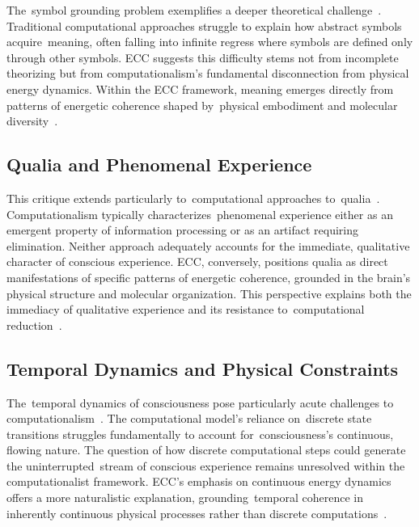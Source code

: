 The~symbol grounding problem exemplifies a deeper theoretical challenge~\cite{harnad1990symbol,juarrero2023context}. Traditional computational approaches struggle to explain how abstract symbols acquire~meaning, often falling into infinite regress where symbols are defined only through other symbols. ECC suggests this difficulty stems not from incomplete theorizing but from computationalism's fundamental disconnection from physical energy dynamics. Within the ECC framework, meaning emerges directly from patterns of energetic coherence shaped by~physical embodiment and molecular diversity~\cite{levin2019computational,gershman2023molecular}.

\subsection*{Qualia and Phenomenal Experience}

This critique extends particularly to~computational approaches to~qualia~\cite{chalmers1997conscious,seth2021being}. Computationalism typically characterizes~phenomenal experience either as an emergent property of information processing or as an artifact requiring elimination. Neither approach adequately accounts for the immediate, qualitative character of conscious experience. ECC, conversely, positions qualia as direct manifestations of specific patterns of energetic coherence, grounded in the brain's physical structure and molecular organization. This perspective explains both the immediacy of qualitative experience and its resistance to~computational reduction~\cite{varela1996neurophenomenology,gallagher2020phenomenological}.

\subsection*{Temporal Dynamics and Physical Constraints}

The~temporal dynamics of consciousness pose particularly acute challenges to computationalism~\cite{zheng2025unbearable,amil2024theta}. The computational model's reliance on~discrete state transitions struggles fundamentally to account for~consciousness's continuous, flowing nature. The question of how discrete computational steps could generate the uninterrupted~stream of conscious experience remains unresolved within the computationalist framework. ECC's emphasis on continuous energy dynamics offers a more naturalistic explanation, grounding~temporal coherence in inherently continuous physical processes rather than discrete computations~\cite{breakspear2005dynamics,van2025processes}.

